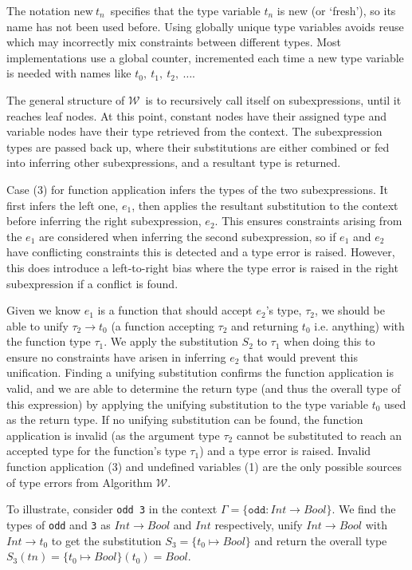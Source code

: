 \documentclass[a4paper,fleqn,oneside,12pt]{report}
\newcommand{\W}{$\mathcal{W}$}
\begin{document}
The notation $\textrm{new}\ t_n$\ specifies that the type variable $t_n$ is new (or `fresh'), so its name has not been used before. Using globally unique type variables avoids reuse which may incorrectly mix constraints between different types. Most implementations use a global counter, incremented each time a new type variable is needed with names like $t_0,\ t_1,\ t_2,\ \dots$.

The general structure of \W\ is to recursively call itself on subexpressions, until it reaches leaf nodes. At this point, constant nodes have their assigned type and variable nodes have their type retrieved from the context. The subexpression types are passed back up, where their substitutions are either combined or fed into inferring other subexpressions, and a resultant type is returned.

Case (3) for function application infers the types of the two subexpressions. It first infers the left one, $e_1$, then applies the resultant substitution to the context before inferring the right subexpression, $e_2$. This ensures constraints arising from the $e_1$ are considered when inferring the second subexpression, so if $e_1$ and $e_2$ have conflicting constraints this is detected and a type error is raised. However, this does introduce a left-to-right bias where the type error is raised in the right subexpression if a conflict is found.

Given we know $e_1$ is a function that should accept $e_2$'s type, $\tau_2$, we should be able to unify $\tau_2 \rightarrow t_0$ (a function accepting $\tau_2$ and returning $t_0$ i.e. anything) with the function type $\tau_1$. We apply the substitution $S_2$ to $\tau_1$ when doing this to ensure no constraints have arisen in inferring $e_2$ that would prevent this unification. Finding a unifying substitution confirms the function application is valid, and we are able to determine the return type (and thus the overall type of this expression) by applying the unifying substitution to the type variable $t_0$ used as the return type. If no unifying substitution can be found, the function application is invalid (as the argument type $\tau_2$ cannot be substituted to reach an accepted type for the function’s type $\tau_1$) and a type error is raised. Invalid function application (3) and undefined variables (1) are the only possible sources of type errors from Algorithm \W.

To illustrate, consider \texttt{odd 3} in the context $\Gamma = \{ \mathtt{odd} : Int \rightarrow Bool \}$. We find the types of \texttt{odd} and \texttt{3} as $Int \rightarrow Bool$ and $Int$ respectively, unify $Int \rightarrow Bool$ with $Int \rightarrow t_0$ to get the substitution $S_3 = \{ t_0 \mapsto Bool \}$ and return the overall type $S_3(tn) = \{ t_0 \mapsto Bool \}(t_0) = Bool$.
\end{document}
